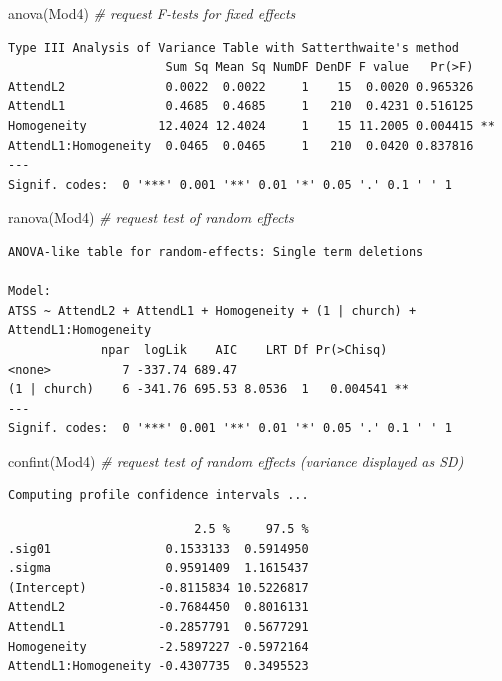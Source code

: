 \documentclass[
  english,
]{book}
\newenvironment{Shaded}{\begin{snugshade}}{\end{snugshade}}
\newcommand{\CommentTok}[1]{\textcolor[rgb]{0.56,0.35,0.01}{\textit{#1}}}
\newcommand{\FunctionTok}[1]{\textcolor[rgb]{0.00,0.00,0.00}{#1}}
\newcommand{\NormalTok}[1]{#1}
\begin{document}
\begin{Shaded}
\begin{Highlighting}[]
\FunctionTok{anova}\NormalTok{(Mod4) }\CommentTok{\# request F{-}tests for fixed effects}
\end{Highlighting}
\end{Shaded}

\begin{verbatim}
Type III Analysis of Variance Table with Satterthwaite's method
                      Sum Sq Mean Sq NumDF DenDF F value   Pr(>F)   
AttendL2              0.0022  0.0022     1    15  0.0020 0.965326   
AttendL1              0.4685  0.4685     1   210  0.4231 0.516125   
Homogeneity          12.4024 12.4024     1    15 11.2005 0.004415 **
AttendL1:Homogeneity  0.0465  0.0465     1   210  0.0420 0.837816   
---
Signif. codes:  0 '***' 0.001 '**' 0.01 '*' 0.05 '.' 0.1 ' ' 1
\end{verbatim}

\begin{Shaded}
\begin{Highlighting}[]
\FunctionTok{ranova}\NormalTok{(Mod4) }\CommentTok{\# request test of random effects}
\end{Highlighting}
\end{Shaded}

\begin{verbatim}
ANOVA-like table for random-effects: Single term deletions

Model:
ATSS ~ AttendL2 + AttendL1 + Homogeneity + (1 | church) + AttendL1:Homogeneity
             npar  logLik    AIC    LRT Df Pr(>Chisq)   
<none>          7 -337.74 689.47                        
(1 | church)    6 -341.76 695.53 8.0536  1   0.004541 **
---
Signif. codes:  0 '***' 0.001 '**' 0.01 '*' 0.05 '.' 0.1 ' ' 1
\end{verbatim}

\begin{Shaded}
\begin{Highlighting}[]
\FunctionTok{confint}\NormalTok{(Mod4) }\CommentTok{\# request test of random effects (variance displayed as SD)}
\end{Highlighting}
\end{Shaded}

\begin{verbatim}
Computing profile confidence intervals ...
\end{verbatim}

\begin{verbatim}
                          2.5 %     97.5 %
.sig01                0.1533133  0.5914950
.sigma                0.9591409  1.1615437
(Intercept)          -0.8115834 10.5226817
AttendL2             -0.7684450  0.8016131
AttendL1             -0.2857791  0.5677291
Homogeneity          -2.5897227 -0.5972164
AttendL1:Homogeneity -0.4307735  0.3495523
\end{verbatim}
\end{document}
